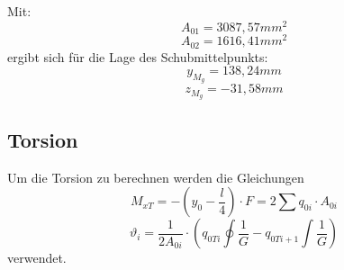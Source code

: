 Mit:
\begin{equation}
	A_{01}=3087,57mm^2
\end{equation}
\begin{equation}
	A_{02}=1616,41mm^2
\end{equation}
ergibt sich für die Lage des Schubmittelpunkts:
\begin{equation}
	y_{M_{g}}=138,24mm
\end{equation}
\begin{equation}
	z_{M_{g}}=-31,58mm
\end{equation}

\subsection{Torsion}
Um die Torsion zu berechnen werden die Gleichungen
\begin{equation}
	M_{xT}=-(y_{0}-\frac{l}{4})\cdot F=2\sum q_{0i}\cdot A_{0i}
\end{equation}
\begin{equation}
	\vartheta_{i}=\frac{1}{2 A_{0i}}\cdot (q_{0Ti}\oint\frac{1}{G}-q_{0Ti+1}\int\frac{1}{G})
\end{equation}
verwendet.











